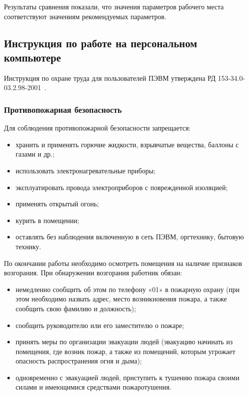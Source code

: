Результаты сравнения показали, что значения параметров рабочего места 
соответствуют значениям рекомендуемых параметров.

\subsection{Инструкция по работе на персональном компьютере}

Инструкция по охране труда для пользователей ПЭВМ утверждена РД 153-34.0-03.2.98-2001~\cite{rd_computer}.

\subsubsection{Противопожарная безопасность}

Для соблюдения противопожарной безопасности запрещается:
\begin{itemize}
 \item хранить и применять горючие жидкости, взрывчатые вещества, баллоны с газами и др.;
 \item использовать электронагревательные приборы;
 \item эксплуатировать провода электроприборов с поврежденной изоляцией;
 \item применять открытый огонь;
 \item курить в помещении;
 \item оставлять без наблюдения включенную в сеть ПЭВМ, оргтехнику, бытовую технику.
\end{itemize}

По окончании работы необходимо осмотреть помещения на наличие признаков возгорания. 
При обнаружении возгорания работник обязан:
\begin{itemize}
 \item немедленно сообщить об этом по телефону «01» в пожарную охрану 
 (при этом необходимо назвать адрес, место возникновения пожара, а также сообщить свою фамилию и должность);
 \item сообщить руководителю или его заместителю о пожаре;
 \item принять меры по организации эвакуации людей (эвакуацию начинать из помещения, 
 где возник пожар, а также из помещений, которым угрожает опасность распространения огня и дыма);
 \item одновременно с эвакуацией людей, приступить к тушению пожара своими силами и 
 имеющимися средствами пожаротушения.
\end{itemize}

